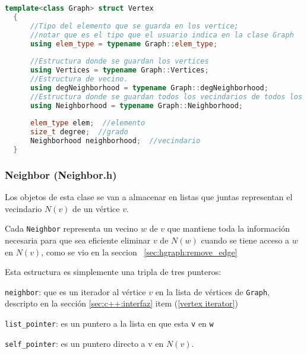\documentclass[a4paper,12pt]{article}
\makeatletter
\newcommand{\Code}[1]{\lstinline[basicstyle={\tt}]@#1@}
\makeatother
\begin{document}
\begin{lstlisting}[language={C++},caption={Estructura del tipo Grafo en C++.},gobble=2,float=ht,label={lst:c++:graph}]
  template<class Graph> struct Vertex
  {
      //Tipo del elemento que se guarda en los vertice;
      //notar que es el tipo que el usuario indica en la clase Graph
      using elem_type = typename Graph::elem_type;
  
      //Estructura donde se guardan los vertices
      using Vertices = typename Graph::Vertices;
      //Estructura de vecino.
      using degNeighborhood = typename Graph::degNeighborhood;
      //Estructura donde se guardan todos los vecindarios de todos los grados.
      using Neighborhood = typename Graph::Neighborhood;
      
      elem_type elem;  //elemento
      size_t degree;  //grado
      Neighborhood neighborhood;  //vecindario
  }
\end{lstlisting}

\subsubsection{Neighbor (Neighbor.h)}
\label{sec:c++:estructura:Neighbor.h}

Los objetos de esta clase se van a almacenar en listas que juntas representan el vecindario $N(v)$ de un vértice $v$.

Cada \Code{Neighbor} representa un vecino $w$ de $v$ que mantiene toda la información necesaria para que sea eficiente eliminar $v$ de $N(w)$ cuando se tiene acceso a $w$ en $N(v)$, como se vio en la seccion ~\ref{sec:hgraph:remove_edge}

Esta estructura es simplemente una tripla de tres punteros:

\Code{neighbor}: que es un iterador al vértice $v$ en la lista de vértices de \Code{Graph}, descripto en la sección \ref{sec:c++:interfaz} item (\ref{vertex iterator})

\Code{list_pointer}: es un puntero a la lista en que esta \Code{v} en \Code{w}

\Code{self_pointer}: es un puntero directo a v en $N(v)$.
\end{document}
